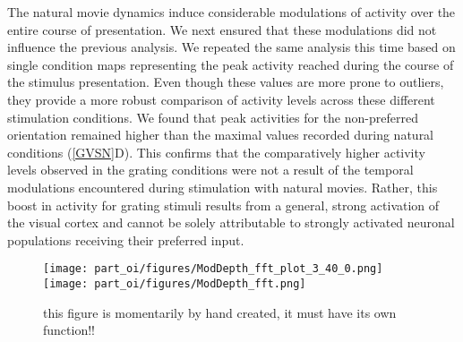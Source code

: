 The natural movie dynamics induce considerable modulations of activity over
the entire course of presentation. We next ensured that these modulations
did not influence the previous analysis. We repeated the same analysis this
time based on single condition maps representing the peak activity reached
during the course of the stimulus presentation. Even though these values
are more prone to outliers, they provide a more robust comparison of
activity levels across these different stimulation conditions. We found
that peak activities for the non-preferred orientation remained higher than
the maximal values recorded during natural conditions (\ref{GVSN}D). This
confirms that the comparatively higher activity levels observed in the
grating conditions were not a result of the temporal modulations
encountered during stimulation with natural movies. Rather, this boost in
activity for grating stimuli results from a general, strong activation of
the visual cortex and cannot be solely attributable to strongly activated
neuronal populations receiving their preferred input. 

\begin{figure}
\centerline{
\label{md_exp}
\texttt{[image: part\_oi/figures/ModDepth\_fft\_plot\_3\_40\_0.png]}
\label{md_all}
\texttt{[image: part\_oi/figures/ModDepth\_fft.png]} } 

\caption{this figure is momentarily by hand created, it must have its own
function!!}  \end{figure}




